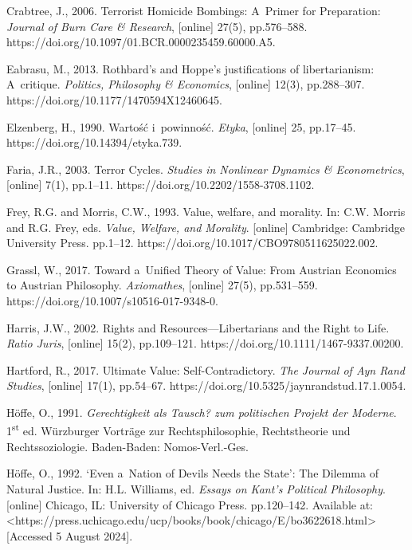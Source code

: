 Crabtree, J., 2006. Terrorist Homicide Bombings: A~Primer for Preparation: \textit{Journal of Burn Care \& Research}, [online] 27(5), pp.576–588. https://doi.org/10.1097/01.BCR.0000235459.60000.A5.



Eabrasu, M., 2013. Rothbard's and Hoppe's justifications of libertarianism: A~critique. \textit{Politics, Philosophy \& Economics}, [online] 12(3), pp.288–307. https://doi.org/10.1177/1470594X12460645.



Elzenberg, H., 1990. Wartość i~powinność. \textit{Etyka}, [online] 25, pp.17–45. https://doi.org/10.14394/etyka.739.



Faria, J.R., 2003. Terror Cycles. \textit{Studies in Nonlinear Dynamics \& Econometrics}, [online] 7(1), pp.1–11. https://doi.org/10.2202/1558-3708.1102.



Frey, R.G. and Morris, C.W., 1993. Value, welfare, and morality. In: C.W. Morris and R.G. Frey, eds. \textit{Value, Welfare, and Morality}. [online] Cambridge: Cambridge University Press. pp.1–12. https://doi.org/10.1017/CBO9780511625022.002.



Grassl, W., 2017. Toward a~Unified Theory of Value: From Austrian Economics to Austrian Philosophy. \textit{Axiomathes}, [online] 27(5), pp.531–559. https://doi.org/10.1007/s10516-017-9348-0.



Harris, J.W., 2002. Rights and Resources---Libertarians and the Right to Life. \textit{Ratio Juris}, [online] 15(2), pp.109–121. https://doi.org/10.1111/1467-9337.00200.



Hartford, R., 2017. Ultimate Value: Self-Contradictory. \textit{The Journal of Ayn Rand Studies}, [online] 17(1), pp.54–67. https://doi.org/10.5325/jaynrandstud.17.1.0054.



Höffe, O., 1991. \textit{Gerechtigkeit als Tausch? zum politischen Projekt der Moderne}. 1\textsuperscript{st} ed. Würzburger Vorträge zur Rechtsphilosophie, Rechtstheorie und Rechtssoziologie. Baden-Baden: Nomos-Verl.-Ges.



Höffe, O., 1992. ‘Even a~Nation of Devils Needs the State': The Dilemma of Natural Justice. In: H.L. Williams, ed. \textit{Essays on Kant's Political Philosophy}. [online] Chicago, IL: University of Chicago Press. pp.120–142. Available at: {\textless}https://press.uchicago.edu/ucp/books/book/chicago/E/bo3622618.html{\textgreater} [Accessed 5 August 2024].



